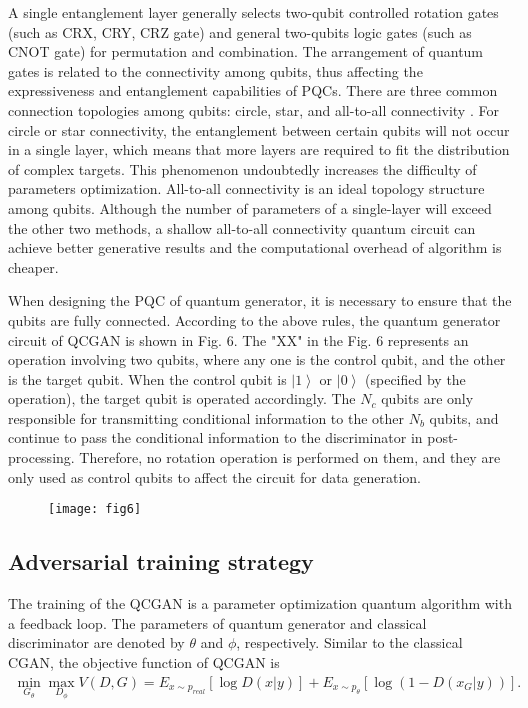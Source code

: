 \documentclass{bmcart}
\begin{document}
A single entanglement layer generally selects two-qubit controlled rotation gates (such as CRX, CRY, CRZ gate) and general two-qubits logic gates (such as CNOT gate) for permutation and combination. The arrangement of quantum gates is related to the connectivity among qubits, thus affecting the expressiveness and entanglement capabilities of PQCs. There are three common connection topologies among qubits: circle, star, and all-to-all connectivity \cite{Sim2019,Linke}. For circle or star connectivity, the entanglement between certain qubits will not occur in a single layer, which means that more layers are required to fit the distribution of complex targets. This phenomenon undoubtedly increases the difficulty of parameters optimization. All-to-all connectivity is an ideal topology structure among qubits. Although the number of parameters of a single-layer will exceed the other two methods, a shallow all-to-all connectivity quantum circuit can achieve better generative results and the computational overhead of algorithm is cheaper.


When designing the PQC of quantum generator, it is necessary to ensure that the qubits are fully connected. According to the above rules, the quantum generator circuit of QCGAN is shown in Fig. 6. The "XX" in the Fig. 6 represents an operation involving two qubits, where any one is the control qubit, and the other is the target qubit. When the control qubit is $\left| 1 \right\rangle $ or $\left| 0 \right\rangle $ (specified by the operation), the target qubit is operated accordingly. The ${N_c}$ qubits are only responsible for transmitting conditional information to the other ${N_b}$ qubits, and continue to pass the conditional information to the discriminator in post-processing. Therefore, no rotation operation is performed on them, and they are only used as control qubits to affect the circuit for data generation.

  \begin{figure}[h!]
  \texttt{[image: fig6]}
  \caption{}
      \end{figure}


\subsection{Adversarial training strategy}
The training of the QCGAN is a parameter optimization quantum algorithm with a feedback loop. The parameters of quantum generator and classical discriminator are denoted by $\theta $ and $\phi $, respectively. Similar to the classical CGAN, the objective function of QCGAN is
%
\begin{eqnarray}\label{eqexpmuts}
\mathop {\min }\limits_{{G_\theta }} \mathop {\max }\limits_{{D_\phi }} V\left( {D,G} \right) = {E_{x \sim {p_{real}}}}\left[ {\log D\left( {x\left| y \right.} \right)} \right] + {E_{x \sim {p_\theta }}}\left[ {\log \left( {1 - D\left( {{x_G}\left| y \right.} \right)} \right)} \right].
\end{eqnarray}
%
\end{document}

